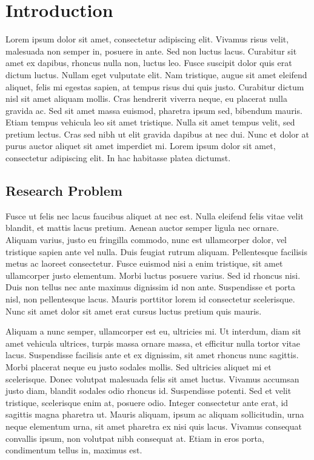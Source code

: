 \chapter{Introduction}

Lorem ipsum dolor sit amet, consectetur adipiscing elit. Vivamus risus velit, malesuada non semper in, posuere in ante. Sed non luctus lacus. Curabitur sit amet ex dapibus, rhoncus nulla non, luctus leo. Fusce suscipit dolor quis erat dictum luctus. Nullam eget vulputate elit. Nam tristique, augue sit amet eleifend aliquet, felis mi egestas sapien, at tempus risus dui quis justo. Curabitur dictum nisl sit amet aliquam mollis. Cras hendrerit viverra neque, eu placerat nulla gravida ac. Sed sit amet massa euismod, pharetra ipsum sed, bibendum mauris. Etiam tempus vehicula leo sit amet tristique. Nulla sit amet tempus velit, sed pretium lectus. Cras sed nibh ut elit gravida dapibus at nec dui. Nunc et dolor at purus auctor aliquet sit amet imperdiet mi. Lorem ipsum dolor sit amet, consectetur adipiscing elit. In hac habitasse platea dictumst.

\section{Research Problem}

Fusce ut felis nec lacus faucibus aliquet at nec est. Nulla eleifend felis vitae velit blandit, et mattis lacus pretium. Aenean auctor semper ligula nec ornare. Aliquam varius, justo eu fringilla commodo, nunc est ullamcorper dolor, vel tristique sapien ante vel nulla. Duis feugiat rutrum aliquam. Pellentesque facilisis metus ac laoreet consectetur. Fusce euismod nisi a enim tristique, sit amet ullamcorper justo elementum. Morbi luctus posuere varius. Sed id rhoncus nisi. Duis non tellus nec ante maximus dignissim id non ante. Suspendisse et porta nisl, non pellentesque lacus. Mauris porttitor lorem id consectetur scelerisque. Nunc sit amet dolor sit amet erat cursus luctus pretium quis mauris.

Aliquam a nunc semper, ullamcorper est eu, ultricies mi. Ut interdum, diam sit amet vehicula ultrices, turpis massa ornare massa, et efficitur nulla tortor vitae lacus. Suspendisse facilisis ante et ex dignissim, sit amet rhoncus nunc sagittis. Morbi placerat neque eu justo sodales mollis. Sed ultricies aliquet mi et scelerisque. Donec volutpat malesuada felis sit amet luctus. Vivamus accumsan justo diam, blandit sodales odio rhoncus id. Suspendisse potenti. Sed et velit tristique, scelerisque enim at, posuere odio. Integer consectetur ante erat, id sagittis magna pharetra ut. Mauris aliquam, ipsum ac aliquam sollicitudin, urna neque elementum urna, sit amet pharetra ex nisi quis lacus. Vivamus consequat convallis ipsum, non volutpat nibh consequat at. Etiam in eros porta, condimentum tellus in, maximus est.

